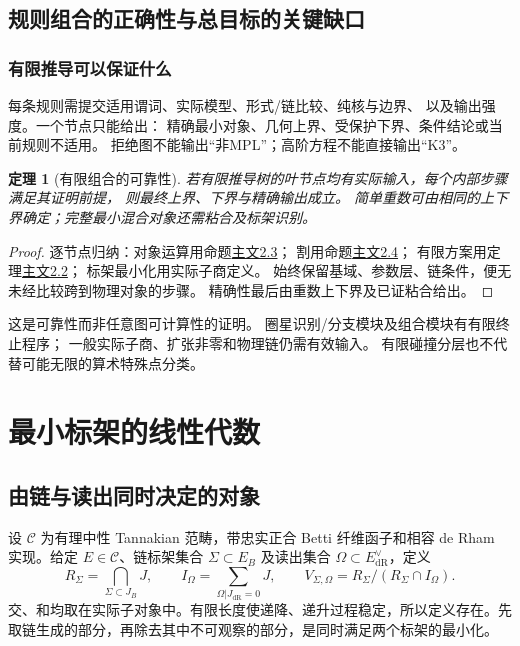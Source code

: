 \documentclass[11pt,a4paper,oneside]{ctexart}
\theoremstyle{cnplain}
\newtheorem{theorem}{定理}[section]
\theoremstyle{definition}
\theoremstyle{remark}
\newcommand{\dR}{\mathrm{dR}}
\numberwithin{equation}{section}
\newcommand{\otherref}[2]{\href{#1.pdf}{#2}}
\begin{document}
\subsection{规则组合的正确性与总目标的关键缺口}
\subsubsection{有限推导可以保证什么}
每条规则需提交适用谓词、实际模型、形式/链比较、纯核与边界、
以及输出强度。一个节点只能给出：
精确最小对象、几何上界、受保护下界、条件结论或当前规则不适用。
拒绝图不能输出“非MPL”；高阶方程不能直接输出“K3”。

\begin{theorem}[有限组合的可靠性]
若有限推导树的叶节点均有实际输入，每个内部步骤满足其证明前提，
则最终上界、下界与精确输出成立。
简单重数可由相同的上下界确定；完整最小混合对象还需粘合及标架识别。
\end{theorem}
\begin{proof}
逐节点归纳：对象运算用命题\otherref{feynman_periods_long_paper}{主文2.3}；
割用命题\otherref{feynman_periods_long_paper}{主文2.4}；
有限方案用定理\otherref{feynman_periods_long_paper}{主文2.2}；
标架最小化用实际子商定义。
始终保留基域、参数层、链条件，便无未经比较跨到物理对象的步骤。
精确性最后由重数上下界及已证粘合给出。
\end{proof}
这是可靠性而非任意图可计算性的证明。
圈星识别/分支模块及组合模块有有限终止程序；
一般实际子商、扩张非零和物理链仍需有效输入。
有限碰撞分层也不代替可能无限的算术特殊点分类。


\endgroup

\section{最小标架的线性代数}\label{ch:frames}

\begingroup

\subsection{由链与读出同时决定的对象}
设 $\mathcal C$ 为有理中性 Tannakian 范畴，带忠实正合 Betti 纤维函子和相容 de Rham 实现。给定 $E\in\mathcal C$、链标架集合 $\Sigma\subset E_B$ 及读出集合 $\Omega\subset E_{\dR}^{\vee}$，定义
\begin{equation}\label{eq:visible}
 R_\Sigma=\bigcap_{\Sigma\subset J_B}J,\qquad
 I_\Omega=\sum_{\Omega|J_{\dR}=0}J,\qquad
 V_{\Sigma,\Omega}=R_\Sigma/(R_\Sigma\cap I_\Omega).
\end{equation}
交、和均取在实际子对象中。有限长度使递降、递升过程稳定，所以定义存在。先取链生成的部分，再除去其中不可观察的部分，是同时满足两个标架的最小化。
\end{document}
